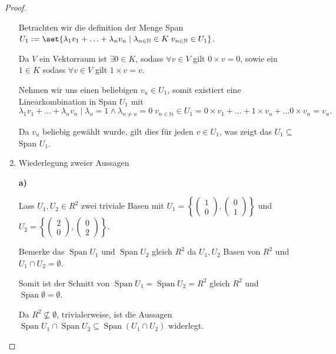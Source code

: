 \documentclass{../problemset}
\begin{document}
\begin{problem}
\begin{proof}
\begin{enumerate}
		      Betrachten wir die definition der Menge Span $U_1 := \set{\lambda_1 v_1 + \ldots + \lambda_n v_n \mid \lambda_{n \in \mathbb{N}} \in K \; v_{n \in \mathbb{N}} \in U_1}$.

		      Da $V$ ein Vektorraum ist $\exists 0 \in K$, sodass $\forall v \in V$ gilt $0 \times v = 0$, sowie ein $1 \in K$ sodass $\forall v \in V$ gilt $1 \times v = v$.

		      Nehmen wir uns einen beliebigen $v_u \in U_1$, somit existiert eine Linearkombination in Span $U_1$ mit \[
			      \lambda_1 v_1 + \ldots + \lambda_n v_n \mid \lambda_u = 1 \land \lambda_{n \ne u} = 0 \; v_{n \in \mathbb{N}} \in U_1 = 0 \times v_1 + \ldots + 1 \times v_u + \ldots 0 \times v_n = v_u.
		      \]

		      Da \(v_u\) beliebig gewählt wurde, gilt dies für jeden \(v \in U_1\), was zeigt das $U_1 \subseteq$ Span $U_1$. \checkmark
		\item Wiederlegung zweier Aussagen

		      \textbf{a)}

		      Lass \(U_1, U_2 \in R^2\) zwei triviale Basen mit \(U_1 = \left\{\begin{pmatrix}
			      1 \\ 0
		      \end{pmatrix},
		      \begin{pmatrix}
			      0 \\ 1
		      \end{pmatrix}\right\}\) und \(U_2 = \left\{\begin{pmatrix}
			      2 \\ 0
		      \end{pmatrix},
		      \begin{pmatrix}
			      0 \\ 2
		      \end{pmatrix}\right\}\).

		      Bemerke das \(\operatorname{Span} U_1\) und \(\operatorname{Span} U_2\) gleich \(R^2\) da \(U_1, U_2\) Basen von \(R^2\)
		      und \(U_1 \cap U_2 = \emptyset \).

		      Somit ist der Schnitt von \(\operatorname{Span} U_1 = \operatorname{Span} U_2 = R^2\) gleich \(R^2\) und \(\operatorname{Span} \emptyset = \emptyset\).

		      Da \(R^2 \not \subseteq \emptyset\), trivialerweise, ist die Aussagen \(\operatorname{Span} U_1 \cap \operatorname{Span} U_2 \subseteq \operatorname{Span}(U_1 \cap U_2)\) widerlegt. \checkmark


\end{enumerate}
\end{proof}
\end{problem}
\end{document}
